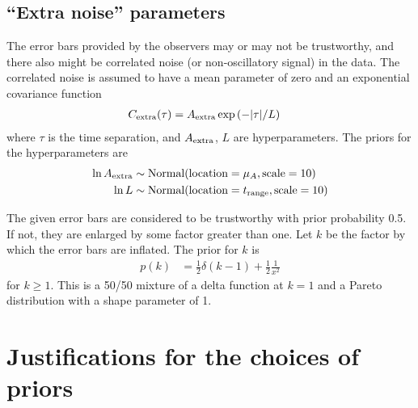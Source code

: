 \documentclass[a4paper, 12pt]{article}
\newcommand{\location}{\textnormal{location}}
\newcommand{\Normal}{\textnormal{Normal}}
\newcommand{\scale}{\textnormal{scale}}
\begin{document}
\subsection{``Extra noise'' parameters}

The error bars provided by the observers may or may not be trustworthy, and
there also might be correlated noise (or non-oscillatory signal) in the data.
The correlated noise is assumed to have a mean parameter of zero
and an exponential covariance function
\begin{align}
C_{\rm extra}(\tau) &= A_{\rm extra}\exp\left(-|\tau| / L\right)
\label{eqn:red_noise}
\end{align}
where $\tau$ is the time separation, and $A_{\rm extra}$, $L$ are
hyperparameters. The priors for the hyperparameters are
\begin{align}
\ln A_{\rm extra} &\sim \Normal(\location=\mu_A, \scale=10) \\
\ln L &\sim \Normal(\location=t_{\rm range}, \scale=10)
\end{align}

The given error bars are considered to be trustworthy with prior probability
0.5. If not, they are enlarged by some factor greater than one. Let $k$ be
the factor by which the error bars are inflated. The prior for $k$ is
\begin{align}
p(k) &= \frac{1}{2}\delta(k-1) + \frac{1}{2}\frac{1}{x^2}
\end{align}
for $k \geq 1$. This is a 50/50 mixture of a delta function at $k=1$
and a Pareto distribution with a shape parameter of 1.

\section{Justifications for the choices of priors}
\end{document}
